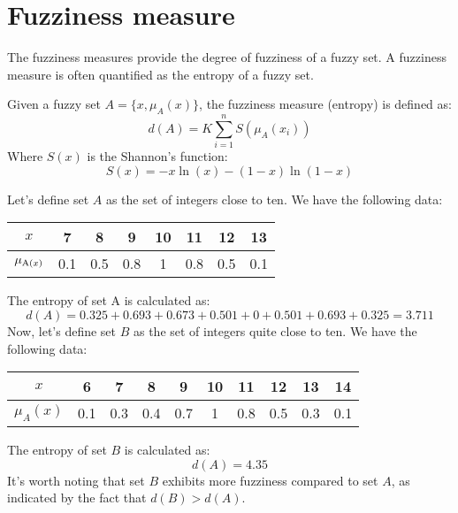 \section{Fuzziness measure}

The fuzziness measures provide the degree of fuzziness of a fuzzy set. A fuzziness measure is often quantified as the entropy of a fuzzy set.
\begin{definition}
    Given a fuzzy set $A=\{x,\mu_A(x)\}$, the fuzziness measure (entropy) is defined as:
    \[d(A)=K \sum_{i=1}^{n}S(\mu_A(x_i))\]
    Where $S(x)$ is the Shannon's function: 
    \[S(x)=-x \ln(x)-(1-x)\ln(1-x)\]
\end{definition}
\begin{example}
    Let's define set $A$ as the set of integers close to ten. 
    We have the following data:
    \begin{center}
        \begin{tabular}{|c|c|c|c|c|c|c|c|} 
        \hline
            $x$ & 7 & 8 & 9 & 10 & 11 & 12 & 13 \\ \hline
            $\mu_{\textnormal{A}(x)}$ & 0.1 & 0.5 & 0.8 & 1 & 0.8 & 0.5 & 0.1 \\ \hline
        \end{tabular}
    \end{center}
    The entropy of set A is calculated as:
    \[d(A)=0.325+0.693+0.673+0.501+0+0.501+0.693+0.325=3.711\]
    Now, let's define set $B$ as the set of integers quite close to ten. 
    We have the following data:
    \begin{center}
        \begin{tabular}{|c|c|c|c|c|c|c|c|c|c|} 
            \hline
            $x$         & 6     & 7     & 8     & 9     & 10    & 11    & 12    & 13    & 14 \\ \hline
            $\mu_A(x)$  & 0.1   & 0.3   & 0.4   & 0.7   & 1     & 0.8   & 0.5   & 0.3   & 0.1 \\ \hline
        \end{tabular}
    \end{center}
    The entropy of set $B$ is calculated as:
    \[d(A)=4.35\]
    It's worth noting that set $B$ exhibits more fuzziness compared to set $A$, as indicated by the fact that $d(B)>d(A)$.
\end{example}